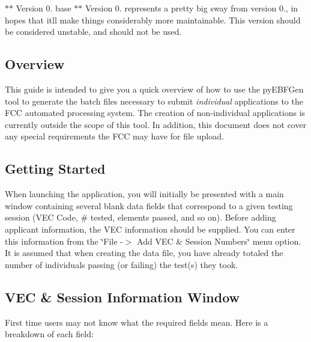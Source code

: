 $\ast$$\ast$ Version 0. base $\ast$$\ast$ Version 0. represents a pretty big sway from version 0., in hopes that it\textquotesingle{}ll make things considerably more maintainable. This version should be considered unstable, and should not be used.

\subsection*{Overview}

This guide is intended to give you a quick overview of how to use the py\+E\+B\+F\+Gen tool to generate the batch files necessary to submit {\itshape individual} applications to the F\+CC automated processing system. The creation of non-\/individual applications is currently outside the scope of this tool. In addition, this document does not cover any special requirements the F\+CC may have for file upload.

\subsection*{Getting Started}

When launching the application, you will initially be presented with a main window containing several blank data fields that correspond to a given testing session (V\+EC Code, \# tested, elements passed, and so on). Before adding applicant information, the V\+EC information should be supplied. You can enter this information from the \char`\"{}\+File -\/$>$ Add V\+E\+C \&
\+Session Numbers\char`\"{} menu option. It is assumed that when creating the data file, you have already totaled the number of individuals passing (or failing) the test(s) they took.

\subsection*{V\+EC \& Session Information Window}

First time users may not know what the required fields mean. Here is a breakdown of each field\+:


